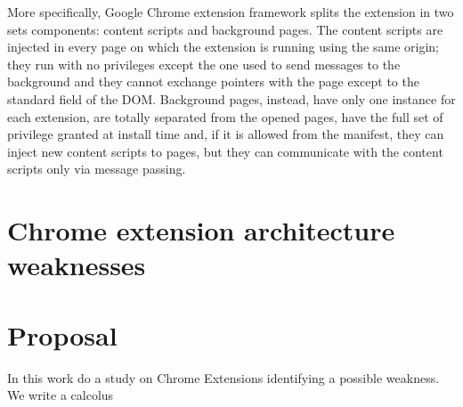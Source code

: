 More specifically, Google Chrome extension framework \cite{ChromeExtensionOnline} splits the extension in two sets components: content scripts and background pages. The content scripts are injected in every page on which the extension is running using the same origin; they run with no privileges except the one used to send messages to the background and they cannot exchange pointers with the page except to the standard field of the DOM. Background pages, instead, have only one instance for each extension, are totally separated from the opened pages, have the full set of privilege granted at install time and, if it is allowed from the manifest, they can inject new content scripts to pages, but they can communicate with the content scripts only via message passing.

\section{Chrome extension architecture weaknesses}
\label{sec:ExtWeakness}



\section{Proposal}
\label{sec:Proposal}
In this work do a study on Chrome Extensions identifying a possible weakness. We write a calcolus 
